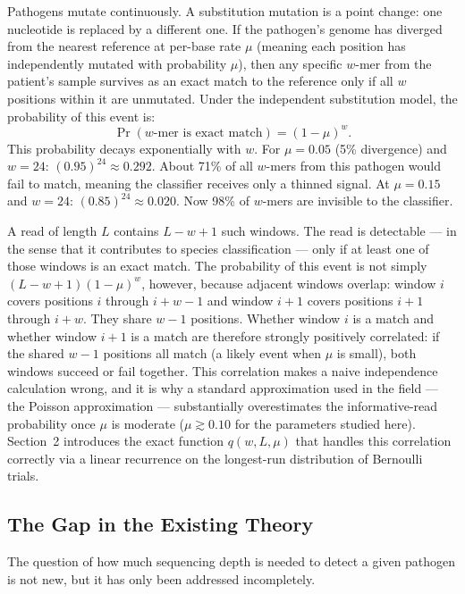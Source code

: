 \documentclass[12pt]{article}
\theoremstyle{definition}
\theoremstyle{plain}
\begin{document}
Pathogens mutate continuously. A substitution mutation is a point change:
one nucleotide is replaced by a different one. If the pathogen's genome has
diverged from the nearest reference at per-base rate $\mu$ (meaning each
position has independently mutated with probability $\mu$), then any
specific $w$-mer from the patient's sample survives as an exact match to the
reference only if all $w$ positions within it are unmutated. Under the
independent substitution model, the probability of this event is:
\begin{equation}\label{eq:wmer}
  \Pr(w\text{-mer is exact match}) = (1-\mu)^{w}.
\end{equation}
This probability decays exponentially with $w$. For $\mu=0.05$ (5\%
divergence) and $w=24$: $(0.95)^{24}\approx 0.292$. About 71\% of all
$w$-mers from this pathogen would fail to match, meaning the classifier
receives only a thinned signal. At $\mu=0.15$ and $w=24$:
$(0.85)^{24}\approx 0.020$. Now 98\% of $w$-mers are invisible to the
classifier.

A read of length $L$ contains $L-w+1$ such windows. The read is detectable
--- in the sense that it contributes to species classification --- only if
at least one of those windows is an exact match. The probability of this
event is not simply $(L-w+1)(1-\mu)^{w}$, however, because adjacent windows
overlap: window $i$ covers positions $i$ through $i+w-1$ and window $i+1$
covers positions $i+1$ through $i+w$. They share $w-1$ positions. Whether
window $i$ is a match and whether window $i+1$ is a match are therefore
strongly positively correlated: if the shared $w-1$ positions all match (a
likely event when $\mu$ is small), both windows succeed or fail together.
This correlation makes a naive independence calculation wrong, and it is why
a standard approximation used in the field --- the Poisson approximation ---
substantially overestimates the informative-read probability once $\mu$ is
moderate ($\mu\gtrsim 0.10$ for the parameters studied here). Section~2
introduces the exact function $q(w,L,\mu)$ that handles this correlation
correctly via a linear recurrence on the longest-run distribution of
Bernoulli trials.

\subsection{The Gap in the Existing Theory}

The question of how much sequencing depth is needed to detect a given
pathogen is not new, but it has only been addressed incompletely.
\end{document}
